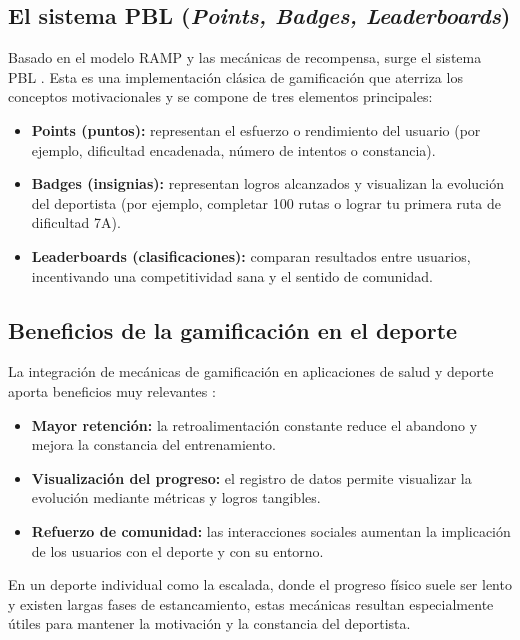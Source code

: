 \subsection{El sistema PBL (\textit{Points, Badges, Leaderboards})}

Basado en el modelo RAMP y las mecánicas de recompensa, surge el sistema PBL \citep{marczewski2013pbl}. Esta es una implementación clásica de 
gamificación que aterriza los conceptos motivacionales y se compone de tres elementos principales:

\begin{itemize}
	\item \textbf{Points (puntos):} representan el esfuerzo o rendimiento del usuario (por ejemplo, dificultad encadenada, número de 
	intentos o constancia).
	\item \textbf{Badges (insignias):} representan logros alcanzados y visualizan la evolución del deportista (por ejemplo, completar 
	100 rutas o lograr tu primera ruta de dificultad 7A).
	\item \textbf{Leaderboards (clasificaciones):} comparan resultados entre usuarios, incentivando una competitividad sana y el sentido 
	de comunidad.
\end{itemize}

\subsection{Beneficios de la gamificación en el deporte}

La integración de mecánicas de gamificación en aplicaciones de salud y deporte aporta beneficios muy 
relevantes \citep{koivisto2019rise}:

\begin{itemize}
	\item \textbf{Mayor retención:} la retroalimentación constante reduce el abandono y mejora la constancia del entrenamiento.
	\item \textbf{Visualización del progreso:} el registro de datos permite visualizar la evolución mediante métricas y logros tangibles.
	\item \textbf{Refuerzo de comunidad:} las interacciones sociales aumentan la implicación de los usuarios con el deporte y con su entorno.
\end{itemize}

En un deporte individual como la escalada, donde el progreso físico suele ser lento y existen largas fases de estancamiento, estas mecánicas 
resultan especialmente útiles para mantener la motivación y la constancia del deportista.


